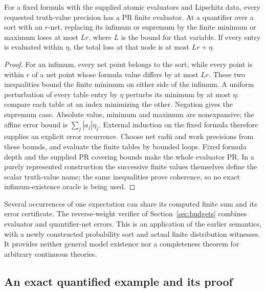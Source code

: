 \begin{proposition}\label{prop:probability-formula}
For a fixed formula with the supplied atomic evaluators and Lipschitz
data, every requested truth-value precision has a PR finite evaluator.
At a quantifier over a sort with an \(r\)-net, replacing its infimum
or supremum by the finite minimum or maximum loses at most \(Lr\),
where \(L\) is the bound for that variable.  If every entry is evaluated
within \(\eta\), the total loss at that node is at most \(Lr+\eta\).
\end{proposition}
\begin{proof}
For an infimum, every net point belongs to the sort, while every point
is within \(r\) of a net point whose formula value differs by at most
\(Lr\).  These two inequalities bound the finite minimum on either
side of the infimum.  A uniform perturbation of every table entry by
\(\eta\) perturbs its minimum by at most \(\eta\): compare each
table at an index minimizing the other.  Negation gives the supremum
case.  Absolute value, minimum and maximum are nonexpansive; the affine
error bound is \(\sum_j|a_j|\eta_j\).  External induction on the
fixed formula therefore supplies an explicit error recurrence.  Choose
net radii and work precisions from these bounds, and evaluate the finite
tables by bounded loops.  Fixed formula depth and the supplied PR
covering bounds make the whole evaluator PR.  In a purely represented
construction the successive finite values themselves define the scalar
truth-value name; the same inequalities prove coherence, so no exact
infimum-existence oracle is being used.
\end{proof}

Several occurrences of one expectation can share its computed finite sum
and its error certificate.  The reverse-weight verifier of
Section~\ref{sec:budgets} combines evaluator and quantifier-net errors.
This is an application of the earlier semantics, with a newly constructed
probability sort and actual finite distribution witnesses.  It provides
neither general model existence nor a completeness theorem for arbitrary
continuous theories.

\subsection{An exact quantified example and its proof}

